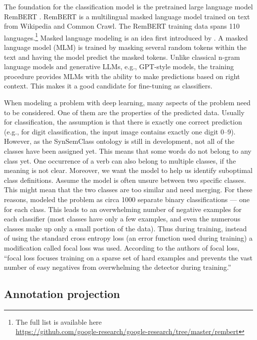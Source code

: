 The foundation for the classification model is the pretrained large language model RemBERT \parencite{chung2021rethinking}. RemBERT is a multilingual masked language model trained on text from Wikipedia and Common Crawl. The RemBERT training data spans 110 languages.\footnote{The full list is available here\\ \url{https://github.com/google-research/google-research/tree/master/rembert}} Masked language modeling is an idea first introduced by \citet{devlin2018bert}. A masked language model (MLM) is trained by masking several random tokens within the text and having the model predict the masked tokens. Unlike classical n-gram language models and generative LLMs, e.g., GPT-style models, the training procedure provides MLMs with the ability to make predictions based on right context. This makes it a good candidate for fine-tuning as classifiers.

When modeling a problem with deep learning, many aspects of the problem need to be considered. One of them are the properties of the predicted data. Usually for classification, the assumption is that there is exactly one correct prediction (e.g., for digit classification, the input image contains exactly one digit 0--9). However, as the SynSemClass ontology is still in development, not all of the classes have been assigned yet. This means that some words do not belong to any class yet. One occurrence of a verb can also belong to multiple classes, if the meaning is not clear. Moreover, we want the model to help us identify suboptimal class definitions. Assume the model is often unsure between two specific classes. This might mean that the two classes are too similar and need merging. For these reasons, \citet{SSC_LLM_Suggestions} modeled the problem as circa 1000 separate binary classifications --- one for each class. This leads to an overwhelming number of negative examples for each classifier (most classes have only a few examples, and even the numerous classes make up only a small portion of the data). Thus during training, instead of using the standard cross entropy loss (an error function used during training) a modification called focal loss \parencite{lin-focal-loss} was used. According to the authors of focal loss, ``focal loss focuses training on a sparse set of hard examples and prevents the vast number of easy negatives from overwhelming the detector during training.''

\subsection{Annotation projection}

